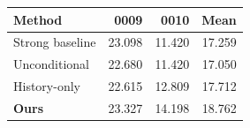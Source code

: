 \begin{tabular}{lrrr}
\toprule
Method & 0009 & 0010 & Mean \\
\midrule
Strong baseline & 23.098 & 11.420 & 17.259 \\
Unconditional & 22.680 & 11.420 & 17.050 \\
History-only & 22.615 & 12.809 & 17.712 \\
\textbf{Ours} & 23.327 & 14.198 & 18.762 \\
\bottomrule
\end{tabular}
